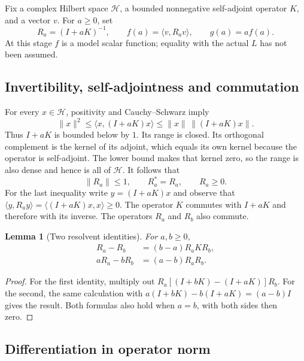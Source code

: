\documentclass[11pt,a4paper]{article}
\numberwithin{equation}{section}
\newtheorem{lemma}[theorem]{Lemma}
\theoremstyle{definition}
\theoremstyle{remark}
\newcommand{\HH}{\mathcal H}
\newcommand{\ip}[2]{\langle #1,#2\rangle}
\newcommand{\norm}[1]{\lVert #1\rVert}
\begin{document}
Fix a complex Hilbert space $\HH$, a bounded nonnegative self-adjoint
operator $K$, and a vector $v$. For $a\geq0$, set
\begin{equation}\label{eq:Rfg}
R_a=(I+aK)^{-1},\qquad f(a)=\ip v{R_av},\qquad g(a)=af(a).
\end{equation}
At this stage $f$ is a model scalar function; equality with the actual
$L$ has not been assumed.

\subsection{Invertibility, self-adjointness and commutation}

For every $x\in\HH$, positivity and Cauchy--Schwarz imply
\[
\norm x^2\leq\ip x{(I+aK)x}\leq\norm x\,\norm{(I+aK)x}.
\]
Thus $I+aK$ is bounded below by $1$. Its range is closed. Its orthogonal
complement is the kernel of its adjoint, which equals its own kernel
because the operator is self-adjoint. The lower bound makes that kernel
zero, so the range is also dense and hence is all of $\HH$.
It follows that
\begin{equation}\label{eq:Rbounds}
\norm{R_a}\leq1,\qquad R_a^*=R_a,\qquad R_a\geq0.
\end{equation}
For the last inequality write $y=(I+aK)x$ and observe that
$\ip y{R_ay}=\ip{(I+aK)x}x\geq0$.
The operator $K$ commutes with $I+aK$ and therefore with its inverse.
The operators $R_a$ and $R_b$ also commute.

\begin{lemma}[Two resolvent identities]\label{lem:resolvents}
For $a,b\geq0$,
\begin{align}
R_a-R_b&=(b-a)R_aKR_b,\label{eq:first-resolvent}\\
aR_a-bR_b&=(a-b)R_aR_b.\label{eq:second-resolvent}
\end{align}
\end{lemma}
\begin{proof}
For the first identity, multiply out
$R_a[(I+bK)-(I+aK)]R_b$.
For the second, the same calculation with
$a(I+bK)-b(I+aK)=(a-b)I$ gives the result.
Both formulas also hold when $a=b$, with both sides then zero.
\end{proof}

\subsection{Differentiation in operator norm}
\end{document}
